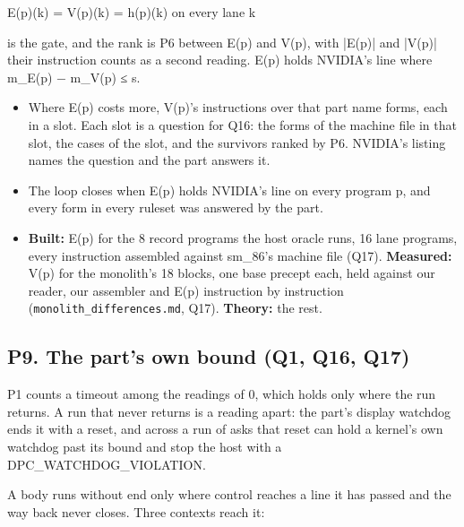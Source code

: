 E(p)(k) = V(p)(k) = h(p)(k) on every lane k

is the gate, and the rank is P6 between E(p) and V(p), with |E(p)| and |V(p)| their instruction counts as a second reading. E(p) holds NVIDIA's line where m\_\allowbreak{}E(p) − m\_\allowbreak{}V(p) ≤ s.

\begin{itemize}
\item Where E(p) costs more, V(p)'s instructions over that part name forms, each in a slot. Each slot is a question for Q16: the forms of the machine file in that slot, the cases of the slot, and the survivors ranked by P6. NVIDIA's listing names the question and the part answers it.
\item The loop closes when E(p) holds NVIDIA's line on every program p, and every form in every ruleset was answered by the part.
\item \textbf{Built:} E(p) for the 8 record programs the host oracle runs, 16 lane programs, every instruction assembled against sm\_\allowbreak{}86's machine file (Q17). \textbf{Measured:} V(p) for the monolith's 18 blocks, one base precept each, held against our reader, our assembler and E(p) instruction by instruction (\texttt{monolith\_\allowbreak{}differences.\allowbreak{}md}, Q17). \textbf{Theory:} the rest.
\end{itemize}

\subsection{\texorpdfstring{P9. The part's own bound (Q1, Q16, Q17)}{P9. The part's own bound (Q1, Q16, Q17)}}

P1 counts a timeout among the readings of 0, which holds only where the run returns. A run that never returns is a reading apart: the part's display watchdog ends it with a reset, and across a run of asks that reset can hold a kernel's own watchdog past its bound and stop the host with a DPC\_\allowbreak{}WATCHDOG\_\allowbreak{}VIOLATION.

A body runs without end only where control reaches a line it has passed and the way back never closes. Three contexts reach it:

